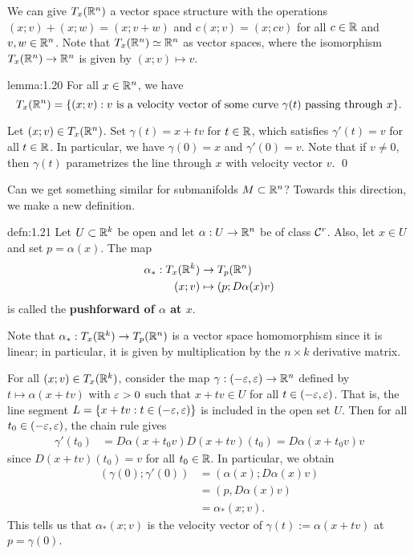 We can give $T_x(\mathbb{R}^n)$ a vector space structure with the operations 
$(x; v) + (x; w) = (x; v+w)$ and $c(x; v) = (x; cv)$ for all 
$c \in \mathbb{R}$ and $v, w \in \mathbb{R}^n$. Note that $T_x(\mathbb{R}^n) \simeq \mathbb{R}^n$ as vector 
spaces, where the isomorphism $T_x(\mathbb{R}^n) \to \mathbb{R}^n$ is given by $(x; v) \mapsto v$. 

\begin{lemma}{lemma:1.20}
    For all $x \in \mathbb{R}^n$, we have 
    \[ T_x(\mathbb{R}^n) = \{(x; v) : v \text{ is a velocity vector of some 
    curve $\gamma(t)$ passing through $x$}\}. \] 
\end{lemma}\vspace{-0.25cm}
\begin{pf}
    Let $(x; v) \in T_x(\mathbb{R}^n)$. Set $\gamma(t) = x + tv$ for $t \in \mathbb{R}$, 
    which satisfies $\gamma'(t) = v$ for all $t \in \mathbb{R}$. In particular, we 
    have $\gamma(0) = x$ and $\gamma'(0) = v$. Note that if $v \neq 0$, then 
    $\gamma(t)$ parametrizes the line through $x$ with velocity vector $v$. \qed 
\end{pf}\vspace{-0.25cm}

Can we get something similar for submanifolds $M \subset \mathbb{R}^n$? 
Towards this direction, we make a new definition. 

\begin{defn}{defn:1.21}
    Let $U \subset \mathbb{R}^k$ be open and let $\alpha : U \to \mathbb{R}^n$ be of class ${\cal C}^r$. 
    Also, let $x \in U$ and set $p = \alpha(x)$. The map 
    \begin{align*}
        \alpha_* : T_x(\mathbb{R}^k) &\to T_p(\mathbb{R}^n) \\ 
        (x; v) &\mapsto (p; D\alpha(x) v)
    \end{align*}
    is called the {\bf pushforward of $\alpha$ at $x$}. 
\end{defn}\vspace{-0.25cm}

Note that $\alpha_* : T_x(\mathbb{R}^k) \to T_p(\mathbb{R}^n)$ is a vector space homomorphism since it is linear; 
in particular, it is given by multiplication by the $n\times k$ derivative matrix. 

For all $(x; v) \in T_x(\mathbb{R}^k)$, consider the map $\gamma : (-\varepsilon, \varepsilon) \to \mathbb{R}^n$
defined by $t \mapsto \alpha(x+tv)$
with $\varepsilon > 0$ such that $x + tv \in U$ for all $t \in (-\varepsilon, \varepsilon)$. 
That is, the line segment $L = \{x + tv : t \in (-\varepsilon, \varepsilon)\}$
is included in the open set $U$. Then for all $t_0 \in (-\varepsilon, \varepsilon)$, 
the chain rule gives 
\begin{align*}
    \gamma'(t_0) &= D\alpha(x + t_0 v) D(x + tv)(t_0) 
    = D\alpha(x + t_0 v) v 
\end{align*}
since $D(x + tv)(t_0) = v$ for all $t_0 \in \mathbb{R}$. In particular, we obtain 
\begin{align*}
    (\gamma(0); \gamma'(0)) &= (\alpha(x); D\alpha(x)v) \\ 
    &= (p, D\alpha(x)v) \\ 
    &= \alpha_*(x; v). 
\end{align*}
This tells us that $\alpha_*(x; v)$ is the velocity vector of 
$\gamma(t) := \alpha(x + tv)$ at $p = \gamma(0)$.

